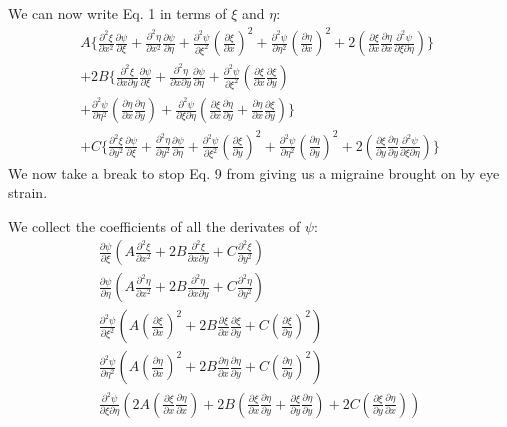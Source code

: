 \documentclass[a4paper,10pt]{article}
\numberwithin{equation}{section}
\begin{document}
We can now write Eq. 1 in terms of $\xi$ and $\eta$:
\begin{multline}
 A\{\frac{\partial ^2 \xi}{\partial x^2}\frac{\partial \psi}{\partial \xi}+\frac{\partial ^2 \eta}{\partial x^2}
\frac{\partial \psi}{\partial \eta}
+\frac{\partial ^2 \psi}{\partial \xi ^2}(\frac{\partial \xi}{\partial x})^2+\frac{\partial ^2 \psi}{\partial \eta ^2}(\frac{\partial \eta}{\partial x})^2
+2(\frac{\partial \xi}{\partial x}\frac{\partial \eta}{\partial x}\frac{\partial ^2 \psi}{\partial \xi \partial \eta})\}\\
+2B\{\frac{\partial ^2\xi}{\partial x \partial y}\frac{\partial \psi}{\partial \xi}
 +\frac{\partial ^2 \eta}{\partial x \partial y}\frac{\partial \psi}{\partial \eta}
 +\frac{\partial^2 \psi}{\partial \xi ^2}(\frac{\partial \xi}{\partial x}\frac{\partial \xi}{\partial y})\\
 +\frac{\partial^2 \psi}{\partial \eta ^2}(\frac{\partial \eta}{\partial x}\frac{\partial \eta}{\partial y})
 +\frac{\partial ^2 \psi}{\partial \xi \partial \eta}(\frac{\partial \xi}{\partial x}\frac{\partial \eta}{\partial y}+\frac{\partial \eta}{\partial x}\frac{\partial \xi}{\partial y} ) \}\\
 +C\{\frac{\partial ^2 \xi}{\partial y^2}\frac{\partial \psi}{\partial \xi}+\frac{\partial ^2 \eta}{\partial y^2}\frac{\partial \psi}{\partial \eta}
+\frac{\partial ^2 \psi}{\partial \xi ^2}(\frac{\partial \xi}{\partial y})^2+\frac{\partial ^2 \psi}{\partial \eta ^2}(\frac{\partial \eta}{\partial y})^2
+2(\frac{\partial \xi}{\partial y}\frac{\partial \eta}{\partial y}\frac{\partial ^2 \psi}{\partial \xi \partial \eta}) \}
\end{multline}
We now take a break to stop Eq. 9 from giving us a migraine brought on by eye strain.

We collect the coefficients of all the derivates of $\psi$:
\begin{gather*}
\frac{\partial \psi}{\partial \xi}(A\frac{\partial ^2 \xi}{\partial x^2}+2B\frac{\partial ^2 \xi}{\partial x \partial y}+C\frac{\partial ^2 \xi}{\partial y^2})\\
\frac{\partial \psi}{\partial \eta}(A\frac{\partial ^2 \eta}{\partial x^2}+2B\frac{\partial ^2 \eta}{\partial x \partial y}+C\frac{\partial ^2 \eta}{\partial y^2})\\
\frac{\partial ^2 \psi}{\partial \xi ^2}(A(\frac{\partial \xi}{\partial x})^2+2B\frac{\partial \xi}{\partial x}\frac{\partial \xi}{\partial y}+C(\frac{\partial \xi}{\partial y})^2)\\
\frac{\partial ^2 \psi}{\partial \eta ^2}(A(\frac{\partial \eta}{\partial x})^2+2B\frac{\partial \eta}{\partial x}\frac{\partial \eta}{\partial y}+C(\frac{\partial \eta}{\partial y})^2)\\
\frac{\partial ^2 \psi}{\partial \xi \partial \eta}(2A(\frac{\partial \xi}{\partial x}\frac{\partial \eta}{\partial x})
+2B(\frac{\partial \xi}{\partial x}\frac{\partial \eta}{\partial y}+\frac{\partial \xi}{\partial y}\frac{\partial \eta}{\partial y})
+2C(\frac{\partial \xi}{\partial y}\frac{\partial \eta}{\partial x}))
\end{gather*}
\end{document}
